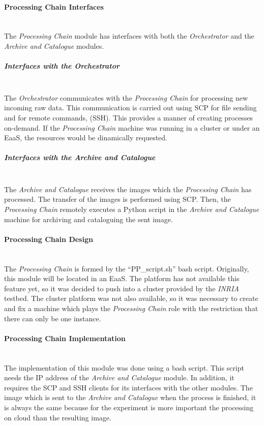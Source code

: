 \paragraph{Processing Chain Interfaces}~\\

The \emph{Processing Chain} module has interfaces with both the \emph{Orchestrator}
and the \emph{Archive and Catalogue} modules.
\subparagraph{Interfaces with the Orchestrator}~\\

The \emph{Orchestrator} communicates with the \emph{Processing Chain} for
processing new incoming raw data. This communication is carried out using \ac{SCP} for file sending and for remote commands, (\ac{SSH}). This provides a manner of creating processes
on-demand. If the \emph{Processing Chain} machine was running in a cluster or
under an \ac{EaaS}, the
resources would be dinamically requested. 

\subparagraph{Interfaces with the Archive and Catalogue}~\\

The \emph{Archive and Catalogue} receives the images which the \emph{Processing
  Chain} has processed. The transfer of the images is performed using \ac{SCP}. Then, the
\emph{Processing Chain} remotely executes a Python script in the \emph{Archive
  and Catalogue} machine for archiving and
cataloguing the sent image.

\paragraph{Processing Chain Design}~\\

The \emph{Processing Chain} is formed by the ``PP\_script.sh'' bash
script. Originally, this module will be located in an \acl{EaaS}. The \bonfire
platform has not available this feature yet, so it was decided to push into a
cluster provided by the \emph{INRIA} testbed. The cluster platform was not also
available, so it was necessary to create and fix a machine which plays the
\emph{Processing Chain} role with the restriction that there can only be one
instance. 

\paragraph{Processing Chain Implementation}~\\
\label{par:pp-impl}
The implementation of this module was done using a bash script. This script needs the
\ac{IP} address of the \emph{Archive and Catalogue} module. In addition, it
requires the \ac{SCP} and \ac{SSH} clients for its interfaces with the other
modules. The image which is sent to the \emph{Archive and Catalogue} when the
process is finished, it is always the
same because for the experiment is more important the processing on cloud than
the resulting image.
  
